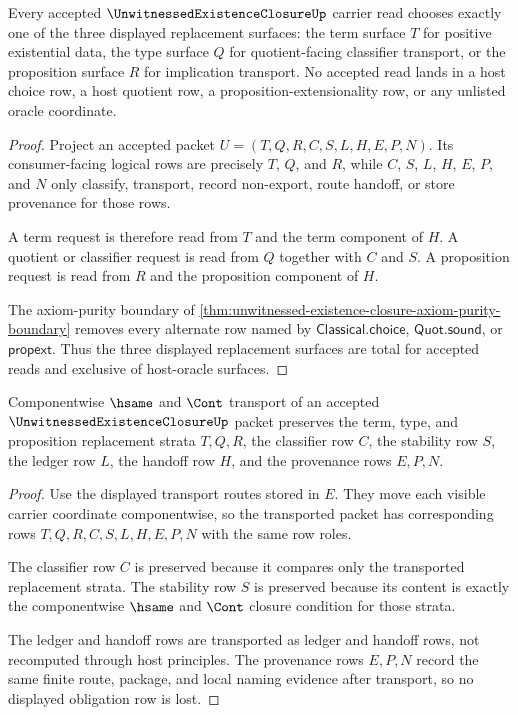 \begin{theorem}
\label{thm:unwitnessed-existence-closure-replacement-surface-totality}
Every accepted $\UnwitnessedExistenceClosureUp$ carrier read chooses exactly one of the three displayed replacement surfaces: the term surface $T$ for positive existential data, the type surface $Q$ for quotient-facing classifier transport, or the proposition surface $R$ for implication transport. No accepted read lands in a host choice row, a host quotient row, a proposition-extensionality row, or any unlisted oracle coordinate.
\end{theorem}
\begin{proof}
Project an accepted packet $U=(T,Q,R,C,S,L,H,E,P,N)$. Its consumer-facing logical rows are precisely $T$, $Q$, and $R$, while $C$, $S$, $L$, $H$, $E$, $P$, and $N$ only classify, transport, record non-export, route handoff, or store provenance for those rows.

A term request is therefore read from $T$ and the term component of $H$. A quotient or classifier request is read from $Q$ together with $C$ and $S$. A proposition request is read from $R$ and the proposition component of $H$.

The axiom-purity boundary of \autoref{thm:unwitnessed-existence-closure-axiom-purity-boundary} removes every alternate row named by $\mathsf{Classical.choice}$, $\mathsf{Quot.sound}$, or $\mathsf{propext}$. Thus the three displayed replacement surfaces are total for accepted reads and exclusive of host-oracle surfaces.
\end{proof}

\begin{theorem}
\label{thm:unwitnessed-existence-closure-stability-transport}
Componentwise $\hsame$ and $\Cont$ transport of an accepted $\UnwitnessedExistenceClosureUp$ packet preserves the term, type, and proposition replacement strata $T,Q,R$, the classifier row $C$, the stability row $S$, the ledger row $L$, the handoff row $H$, and the provenance rows $E,P,N$.
\end{theorem}
\begin{proof}
Use the displayed transport routes stored in $E$. They move each visible carrier coordinate componentwise, so the transported packet has corresponding rows $T,Q,R,C,S,L,H,E,P,N$ with the same row roles.

The classifier row $C$ is preserved because it compares only the transported replacement strata. The stability row $S$ is preserved because its content is exactly the componentwise $\hsame$ and $\Cont$ closure condition for those strata.

The ledger and handoff rows are transported as ledger and handoff rows, not recomputed through host principles. The provenance rows $E,P,N$ record the same finite route, package, and local naming evidence after transport, so no displayed obligation row is lost.
\end{proof}

